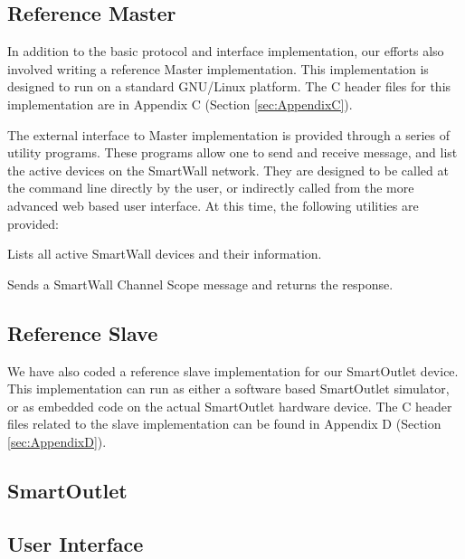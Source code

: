 \documentclass[12pt]{article}
\begin{document}
\subsection{Reference Master}

In addition to the basic protocol and interface implementation, our
efforts also involved writing a reference Master implementation. This
implementation is designed to run on a standard GNU/Linux
platform. The C header files for this implementation are in Appendix C
(Section \ref{sec:AppendixC}).

The external interface to Master implementation is provided through a
series of utility programs. These programs allow one to send and
receive message, and list the active devices on the SmartWall
network. They are designed to be called at the command line directly by
the user, or indirectly called from the more advanced web based user
interface. At this time, the following utilities are provided:
\begin{description}
  \setlength{\itemsep}{0pt}
  \setlength{\parskip}{0pt}
  \setlength{\parsep}{0pt}
\item[swls:] Lists all active SmartWall devices and their information.  
\item[swChnMsg:] Sends a SmartWall Channel Scope message and returns
  the response.
\end{description}

\subsection{Reference Slave}

We have also coded a reference slave implementation for our SmartOutlet
device. This implementation can run as either a software based
SmartOutlet simulator, or as embedded code on the actual SmartOutlet
hardware device. The C header files related to the slave implementation
can be found in Appendix D (Section \ref{sec:AppendixD}).

\subsection{SmartOutlet}

\subsection{User Interface}
\end{document}
